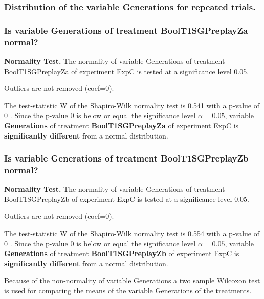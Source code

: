 \documentclass[18pt,c]{beamer}
\begin{document}
 \begin{frame}
 \fontsize{8pt}{9pt}\selectfont
 \frametitle{ Distribution of the variable Generations for repeated trials. }

 \label{ExpCStatsTable004.tex}  
 \end{frame}

\begin{frame}[t]
 \frametitle{Is variable Generations of treatment BoolT1SGPreplayZa normal?}
 {\bf Normality Test.} The normality of variable Generations of treatment BoolT1SGPreplayZa of experiment ExpC is tested at a significance level 0.05.

 Outliers are not removed (coef=0).
 
 The test-statistic W of the Shapiro-Wilk normality test is 0.541 with a p-value of 0 .
 Since the p-value 0 is below or equal the significance level $\alpha= 0.05 $,
 variable {\bf  Generations } of treatment {\bf  BoolT1SGPreplayZa } of experiment ExpC  is {\bf significantly different} from a normal distribution.

 \end{frame}
\begin{frame}[t]
 \frametitle{Is variable Generations of treatment BoolT1SGPreplayZb normal?}
 {\bf Normality Test.} The normality of variable Generations of treatment BoolT1SGPreplayZb of experiment ExpC is tested at a significance level 0.05.

 Outliers are not removed (coef=0).
 
 The test-statistic W of the Shapiro-Wilk normality test is 0.554 with a p-value of 0 .
 Since the p-value 0 is below or equal the significance level $\alpha= 0.05 $,
 variable {\bf  Generations } of treatment {\bf  BoolT1SGPreplayZb } of experiment ExpC  is {\bf significantly different} from a normal distribution.

 \end{frame}
\begin{frame}
 Because  of the non-normality of variable Generations 
a two sample Wilcoxon test is used for comparing the means 
of the variable Generations of the treatments.
 \end{frame}
\end{document}
